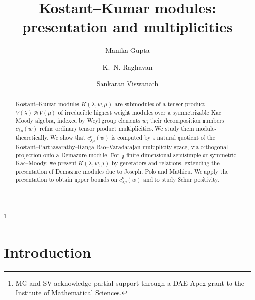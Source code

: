 \documentclass[12pt,reqno]{amsart}
\theoremstyle{plain}
\theoremstyle{definition}
\theoremstyle{remark}
\theoremstyle{plain}
\begin{document}
\title{Kostant--Kumar modules: presentation and multiplicities}

\author{Manika Gupta}
\address{The Institute of Mathematical Sciences, Chennai, India}
\address{Homi Bhabha National Institute, Training School Complex, Anushakti Nagar, Mumbai 400094, India}

\author{K.~N. Raghavan}
\address{Krea University, Sri City, Andhra Pradesh, India}

\author{Sankaran Viswanath}
\address{The Institute of Mathematical Sciences, Chennai, India}
\address{Homi Bhabha National Institute, Training School Complex, Anushakti Nagar, Mumbai 400094, India}

\thanks{MG and SV acknowledge partial support through a DAE Apex grant to the Institute of Mathematical Sciences.}


\begin{abstract}
Kostant--Kumar modules $K(\lambda,w,\mu)$ are submodules of a tensor
product $V(\lambda)\otimes V(\mu)$ of irreducible highest weight modules
over a symmetrizable Kac--Moody algebra, indexed by Weyl group elements
$w$; their decomposition numbers $c^\nu_{\lambda\mu}(w)$ refine ordinary
tensor product multiplicities. We study them module-theoretically. We show
that $c^\nu_{\lambda\mu}(w)$ is computed by a natural quotient of the
Kostant--Parthasarathy--Ranga Rao--Varadarajan multiplicity space, via
orthogonal projection onto a Demazure module. For $\mathfrak{g}$
finite-dimensional semisimple or symmetric Kac--Moody, we present
$K(\lambda,w,\mu)$ by generators and relations, extending the presentation
of Demazure modules due to Joseph, Polo and Mathieu. 
We apply the presentation to obtain upper bounds on
$c^\nu_{\lambda\mu}(w)$ and to study Schur positivity.
\end{abstract}

\maketitle


\section{Introduction}
\end{document}
